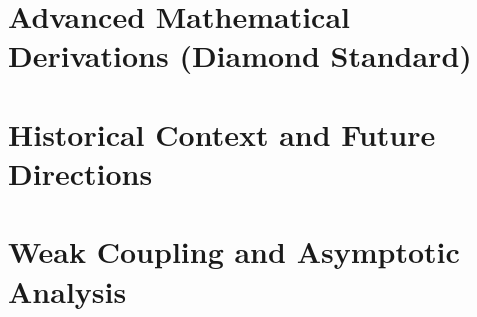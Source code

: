 \documentclass[11pt,a4paper]{report}
\begin{document}
\chapter{Advanced Mathematical Derivations (Diamond Standard)}
\label{ch:advanced-derivations}


% 
% 
% 
% 













\chapter{Historical Context and Future Directions}
\label{ch:future}




\chapter{Weak Coupling and Asymptotic Analysis}
\label{ch:weak-coupling}




\end{document}
